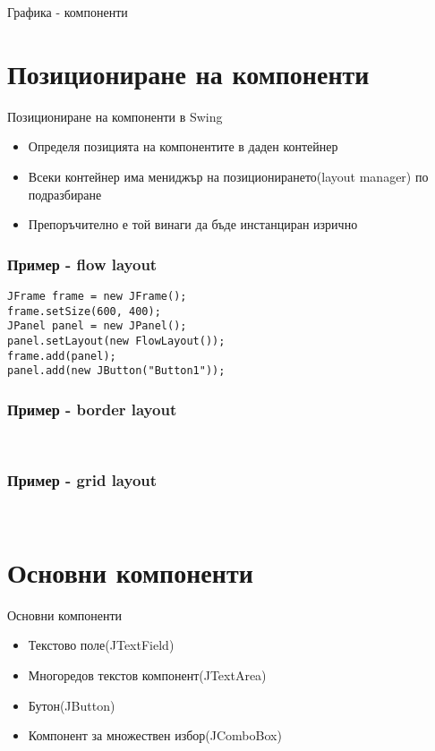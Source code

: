\documentclass{beamer}
\begin{document}
\begin{frame}{Графика - компоненти}
  \transdissolve
  
\end{frame}
\section{Позициониране на компоненти}

\begin{frame}{Позициониране на компоненти в Swing}
  \transdissolve
  \begin{itemize}
  \item Определя позицията на компонентите в даден контейнер
  \item Всеки контейнер има мениджър на позиционирането(layout
    manager) по подразбиране
  \item Препоръчително е той винаги да бъде инстанциран изрично
  \end{itemize}
\end{frame}

\begin{frame}[fragile]
  \frametitle{Пример - flow layout}
  \transdissolve
\begin{lstlisting}
JFrame frame = new JFrame();
frame.setSize(600, 400);
JPanel panel = new JPanel();
panel.setLayout(new FlowLayout());
frame.add(panel);
panel.add(new JButton("Button1"));
\end{lstlisting}
\end{frame}

\begin{frame}[fragile]
  \frametitle{Пример - border layout}
  \transdissolve
\begin{lstlisting}
  
\end{lstlisting}
\end{frame}

\begin{frame}[fragile]
  \frametitle{Пример - grid layout}
  \transdissolve
\begin{lstlisting}
  
\end{lstlisting}
\end{frame}


\section{Основни компоненти}

\begin{frame}{Основни компоненти}
  \transdissolve
  \begin{itemize}
  \item Текстово поле(JTextField)
  \item Многоредов текстов компонент(JTextArea)
  \item Бутон(JButton)
  \item Компонент за множествен избор(JComboBox)
  \end{itemize}
\end{frame}
\end{document}
